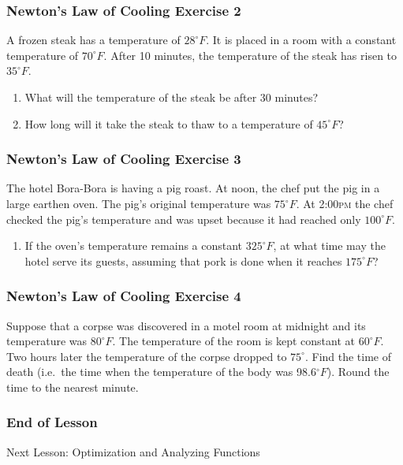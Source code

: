 \documentclass[xcolor=dvipsnames]{beamer}
\begin{document}
\begin{frame}
  \frametitle{Newton's Law of Cooling Exercise 2}
A frozen steak has a temperature of $28^{\circ}F$. It is placed in a
room with a constant temperature of $70^{\circ}F$. After 10 minutes,
the temperature of the steak has risen to $35^{\circ}F$. 
\begin{enumerate}
\item<1-> What will the temperature of the steak be after 30 minutes?
\item<2-> How long will it take the steak to thaw to a temperature of $45^{\circ}F$?
\end{enumerate}
\end{frame}

\begin{frame}
  \frametitle{Newton's Law of Cooling Exercise 3}
The hotel Bora-Bora is having a pig roast. At noon, the chef put the
pig in a large earthen oven. The pig's original temperature was
$75^{\circ}F$. At 2:00\textsc{pm} the chef checked the pig's
temperature and was upset because it had reached only $100^{\circ}F$.
\begin{enumerate}
\item If the oven's temperature remains a constant $325^{\circ}F$, at
  what time may the hotel serve its guests, assuming that pork is done
  when it reaches $175^{\circ}F$?
\end{enumerate}
\end{frame}

\begin{frame}
  \frametitle{Newton's Law of Cooling Exercise 4}
  Suppose that a corpse was discovered in a motel room at midnight and
  its temperature was $80^{\circ}F$. The temperature of the room is
  kept constant at $60^{\circ}F$. Two hours later the temperature of
  the corpse dropped to $75^{\circ}$. Find the time of death (i.e.\
  the time when the temperature of the body was 98.6$^{\circ}F$).
  Round the time to the nearest minute.
\end{frame}

\begin{frame}
  \frametitle{End of Lesson}
Next Lesson: Optimization and Analyzing Functions
\end{frame}
\end{document}
